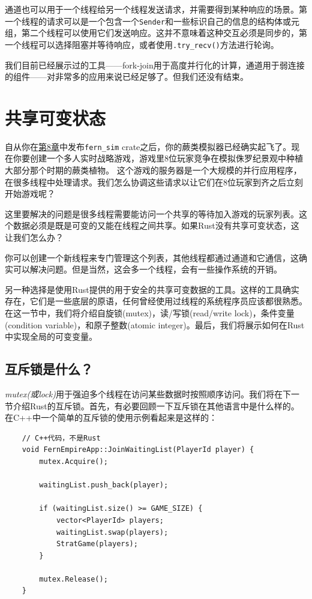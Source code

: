 通道也可以用于一个线程给另一个线程发送请求，并需要得到某种响应的场景。第一个线程的请求可以是一个包含一个\texttt{Sender}和一些标识自己的信息的结构体或元组，第二个线程可以使用它们发送响应。这并不意味着这种交互必须是同步的，第一个线程可以选择阻塞并等待响应，或者使用\texttt{.try\_recv()}方法进行轮询。

我们目前已经展示过的工具——fork-join用于高度并行化的计算，通道用于弱连接的组件——对非常多的应用来说已经足够了。但我们还没有结束。

\section{共享可变状态}

自从你在\hyperref[ch08]{第8章}中发布\texttt{fern\_sim} crate之后，你的蕨类模拟器已经确实起飞了。现在你要创建一个多人实时战略游戏，游戏里8位玩家竞争在模拟侏罗纪景观中种植大部分那个时期的蕨类植物。 这个游戏的服务器是一个大规模的并行应用程序，在很多线程中处理请求。我们怎么协调这些请求以让它们在8位玩家到齐之后立刻开始游戏呢？

这里要解决的问题是很多线程需要能访问一个共享的等待加入游戏的玩家列表。这个数据必须是既是可变的又能在线程之间共享。如果Rust没有共享可变状态，这让我们怎么办？

你可以创建一个新线程来专门管理这个列表，其他线程都通过通道和它通信，这确实可以解决问题。但是当然，这会多一个线程，会有一些操作系统的开销。

另一种选择是使用Rust提供的用于安全的共享可变数据的工具。这样的工具确实存在，它们是一些底层的原语，任何曾经使用过线程的系统程序员应该都很熟悉。在这一节中，我们将介绍自旋锁(mutex)，读/写锁(read/write lock)，条件变量(condition variable)，和原子整数(atomic integer)。最后，我们将展示如何在Rust中实现全局的可变变量。

\subsection{互斥锁是什么？}

\emph{mutex(或lock)}用于强迫多个线程在访问某些数据时按照顺序访问。我们将在下一节介绍Rust的互斥锁。首先，有必要回顾一下互斥锁在其他语言中是什么样的。在C++中一个简单的互斥锁的使用示例看起来是这样的：
\begin{verbatim}
    // C++代码，不是Rust
    void FernEmpireApp::JoinWaitingList(PlayerId player) {
        mutex.Acquire();

        waitingList.push_back(player);

        if (waitingList.size() >= GAME_SIZE) {
            vector<PlayerId> players;
            waitingList.swap(players);
            StratGame(players);
        }

        mutex.Release();
    }
\end{verbatim}

